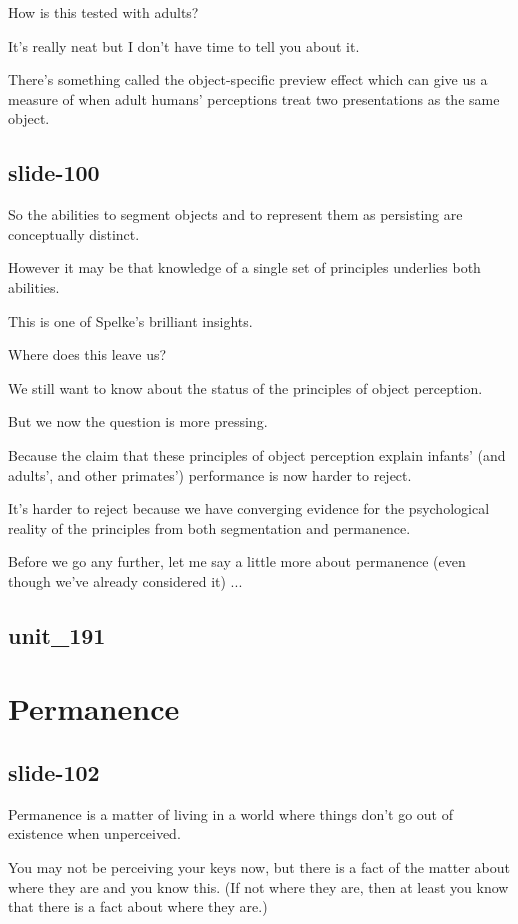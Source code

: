 \documentclass[12pt,\papersize]{extarticle}
\begin{document}
How is this tested with adults?
 
It's really neat but I don't have time to tell you about it.
 
There's something called the object-specific preview effect which can give us a measure of when adult humans' perceptions treat two presentations as the same object.
 
\subsection{slide-100}
So the abilities to segment objects and to represent them as persisting are conceptually distinct.
 
However it may be that knowledge of a single set of principles underlies both abilities.
 
This is one of Spelke's brilliant insights.
 
Where does this leave us?
 
We still want to know about the status of the principles of object perception.
 
But we now the question is more pressing.
 
Because the claim that these principles of object perception explain infants' (and adults', and other primates') performance is now harder to reject.
 
It's harder to reject because we have converging evidence for the psychological reality of the principles from both segmentation and permanence.
 
Before we go any further, let me say a little more about permanence (even though we've already considered it) ...
 
\subsection{unit\_191}
 
 
\section{Permanence}
 
\subsection{slide-102}
Permanence is a matter of living in a world where things don't go out of existence when unperceived.
 
You may not be perceiving your keys now, but there is a fact of the matter about where they are and you know this.  (If not where they are, then at least you know that there is a fact about where they are.)
 
\end{document}
